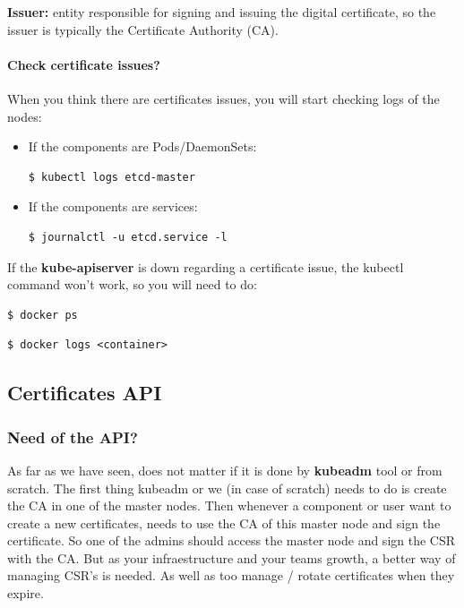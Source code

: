 \documentclass{article}
\newenvironment{blocktemplateIII}[1]{%
    \tcolorbox[beamer,%
    noparskip,breakable,
    ,colframe=Red,%
    colbacklower=LimeGreen!75!LightGreen,%
    title=#1]}%
    {\endtcolorbox}
\newenvironment{codetemplate}[1][]{%
  \mybasecolorbox[#1]
  \itshape
}{%
  \endmybasecolorbox
}
\begin{document}
\textbf{Issuer:} entity responsible for signing and issuing the digital certificate, so the issuer is typically the Certificate Authority (CA). 

\paragraph{Check certificate issues?}
When you think there are certificates issues, you will start checking logs of the nodes:
\begin{itemize}
    \item If the components are Pods/DaemonSets:
\begin{codetemplate}{}
\begin{verbatim}
$ kubectl logs etcd-master
\end{verbatim}
\end{codetemplate}
    \item If the components are services:
\begin{codetemplate}{}
\begin{verbatim}
$ journalctl -u etcd.service -l
\end{verbatim}
\end{codetemplate}
\end{itemize}

\begin{blocktemplateIII}{WARNING}
If the \textbf{kube-apiserver} is down regarding a certificate issue, the kubectl command won't work, so you will need to do:
\begin{codetemplate}{}
\begin{verbatim}
$ docker ps
\end{verbatim}
\end{codetemplate}
\begin{codetemplate}{}
\begin{verbatim}
$ docker logs <container>
\end{verbatim}
\end{codetemplate}
\end{blocktemplateIII}

\subsection{Certificates API}

\subsubsection{Need of the API?}
As far as we have seen, does not matter if it is done by \textbf{kubeadm} tool or from scratch. The first thing kubeadm or we (in case of scratch) needs to do
is create the CA in one of the master nodes. Then whenever a component or user want to create a new certificates, needs to use the CA of this master node and sign the certificate.
So one of the admins should access the master node and sign the CSR with the CA.
But as your infraestructure and your teams growth, a better way of managing CSR's is needed. As well as too manage / rotate certificates when they expire.
\end{document}
